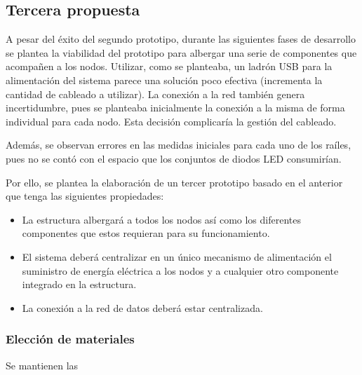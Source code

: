 \subsection{Tercera propuesta}

A pesar del éxito del segundo prototipo, durante las siguientes fases de desarrollo se plantea la viabilidad del prototipo para albergar una serie de componentes que acompañen a los nodos. Utilizar, como se planteaba, un ladrón USB %
para la alimentación del sistema parece una solución poco efectiva (incrementa la cantidad de cableado a utilizar). La conexión a la red también genera incertidumbre, pues se planteaba inicialmente la conexión a la misma de forma individual para cada nodo. Esta decisión complicaría la gestión del cableado.

Además, se observan errores en las medidas iniciales para cada uno de los raíles, pues no se contó con el espacio que los conjuntos de diodos LED consumirían.

Por ello, se plantea la elaboración de un tercer prototipo basado en el anterior que tenga las siguientes propiedades:

\begin{itemize}

\item La estructura albergará a todos los nodos así como los diferentes componentes que estos requieran para su funcionamiento.

\item El sistema deberá centralizar en un único mecanismo de alimentación el suministro de energía eléctrica a los nodos y a cualquier otro componente integrado en la estructura.

\item La conexión a la red de datos deberá estar centralizada.

\end{itemize}

\subsubsection{Elección de materiales}

Se mantienen las 